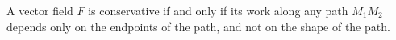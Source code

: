 A vector field $F$ is conservative if and only if its work along any path $M_1M_2$ depends only on the endpoints of the path, and not on the shape of the path.
